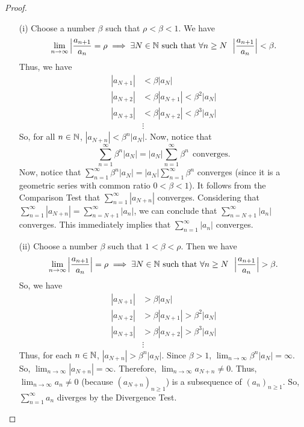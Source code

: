\documentclass[a4paper]{article}
\begin{document}
\begin{proof}
\begin{enumerate}
    \item[(i)] Choose a number \( \beta \) such that \( \rho < \beta < 1 \). We have 
        \[  \lim_{ n \to \infty  }  \Big|  \frac{ {a}_{n+1} }{ {a}_{n} }  = \rho \implies \exists N \in \N \ \text{such that} \ \forall n \geq N \ \ \Big|  \frac{ {a}_{n+1} }{ {a}_{n} }  \Big| < \beta. \]
        Thus, we have 
        \begin{align*}
            | {a}_{N+1} | &< \beta | {a}_{N} |  \\
            | {a}_{N+2} | &< \beta | {a}_{N+1} | < \beta^{2} | {a}_{N} |  \\
            | {a}_{N+3} | &< \beta | {a}_{N+2} | < \beta^{3} | {a}_{N} | \\ 
                          &\vdots 
        \end{align*}
        So, for all \( n \in \mathbb{N} \), \( | {a}_{N +n}  |  < \beta^{n} | {a}_{N} |  \). Now, notice that 
        \[  \sum_{ n=1  }^{ \infty  } \beta^{n} | {a}_{N} | = | {a}_{N} | \sum_{ n=1  }^{ \infty  } \beta^{n} \ \ \text{converges}.  \]
        Now, notice that \( \sum_{ n=1  }^{ \infty  } \beta^{n} | {a}_{N} |  = | {a}_{N} |  \sum_{ n=1  }^{ \infty  } \beta^{n} \) converges (since it is a geometric series with common ratio \( 0 < \beta < 1  \)). It follows from the Comparison Test that \( \sum_{ n=1  }^{ \infty  } | {a}_{N+n} |  \) converges. Considering that \( \sum_{ n=1  }^{ \infty  } | {a}_{N+n} |  = \sum_{ n = N + 1 }^{ \infty  } | {a}_{n} |  \), we can conclude that \( \sum_{ n= N + 1 }^{ \infty  } | {a}_{n} |  \) converges. This immediately implies that \( \sum_{ n=1  }^{ \infty  } | {a}_{n} |  \) converges. 
    \item[(ii)] Choose a number \( \beta  \) such that \( 1 < \beta < \rho \). Then we have 
        \[  \lim_{ n \to \infty  }  \Big|  \frac{ {a}_{n+1} }{ {a}_{n} }  \Big|  = \rho \implies \exists N \in \N \ \text{such that} \ \forall n \geq N \ \ \Big|  \frac{ {a}_{n+1} }{  {a}_{n} }  \Big|  > \beta.   \]
        So, we have 
        \begin{align*}
            | {a}_{N+1} | &> \beta | {a}_{N} |  \\
            | {a}_{N+2} | &> \beta | {a}_{N+1} | > \beta^{2} | {a}_{N} | \\
            | {a}_{N+3} | &> \beta | {a}_{N+2} | > \beta^{3} | {a}_{N} |  \\
                          &\vdots
        \end{align*}
        Thus, for each \( n \in \mathbb{N} \), \( | {a}_{N +n} | > \beta^{n} | {a}_{N} |  \). Since \( \beta > 1  \), \( \lim_{ n \to \infty  }  \beta^{n} | {a}_{N} |  = \infty  \). So, \( \lim_{ n \to \infty  }  | {a}_{N+n} |  = \infty  \). Therefore, \( \lim_{ n \to \infty  }  {a}_{N+n} \neq 0 \). Thus, \( \lim_{ n \to \infty  }  {a}_{n} \neq 0  \) (because \( ({a}_{N+n})_{n \geq1} \)) is a subsequence of \( ({a}_{n})_{n \geq 1} \). So, \( \sum_{ n=1  }^{ \infty  } {a}_{n} \) diverges by the Divergence Test.   
\end{enumerate}
\end{proof}
\end{document}
